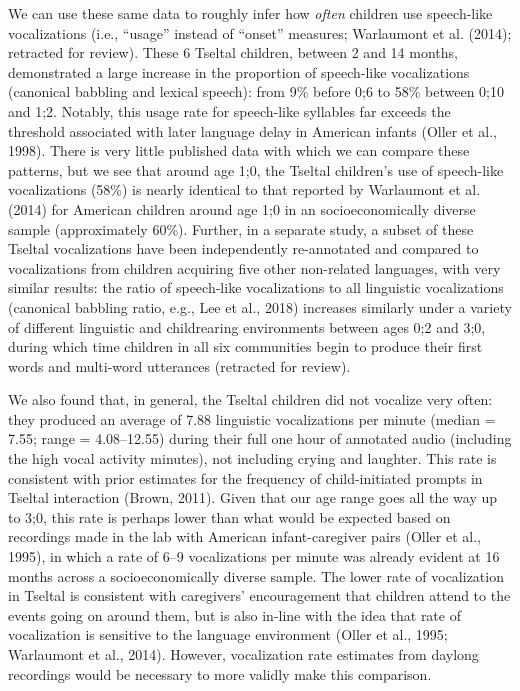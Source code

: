 \documentclass[floatsintext,man]{apa6}
\theoremstyle{definition}
\theoremstyle{definition}
\theoremstyle{definition}
\theoremstyle{remark}
\begin{document}
We can use these same data to roughly infer how \emph{often} children
use speech-like vocalizations (i.e., \enquote{usage} instead of
\enquote{onset} measures; Warlaumont et al. (2014); retracted for
review). These 6 Tseltal children, between 2 and 14 months, demonstrated
a large increase in the proportion of speech-like vocalizations
(canonical babbling and lexical speech): from 9\% before 0;6 to 58\%
between 0;10 and 1;2. Notably, this usage rate for speech-like syllables
far exceeds the threshold associated with later language delay in
American infants (Oller et al., 1998). There is very little published
data with which we can compare these patterns, but we see that around
age 1;0, the Tseltal children's use of speech-like vocalizations (58\%)
is nearly identical to that reported by Warlaumont et al. (2014) for
American children around age 1;0 in an socioeconomically diverse sample
(approximately 60\%). Further, in a separate study, a subset of these
Tseltal vocalizations have been independently re-annotated and compared
to vocalizations from children acquiring five other non-related
languages, with very similar results: the ratio of speech-like
vocalizations to all linguistic vocalizations (canonical babbling ratio,
e.g., Lee et al., 2018) increases similarly under a variety of different
linguistic and childrearing environments between ages 0;2 and 3;0,
during which time children in all six communities begin to produce their
first words and multi-word utterances (retracted for review).

We also found that, in general, the Tseltal children did not vocalize
very often: they produced an average of 7.88 linguistic vocalizations
per minute (median = 7.55; range = 4.08--12.55) during their full one
hour of annotated audio (including the high vocal activity minutes), not
including crying and laughter. This rate is consistent with prior
estimates for the frequency of child-initiated prompts in Tseltal
interaction (Brown, 2011). Given that our age range goes all the way up
to 3;0, this rate is perhaps lower than what would be expected based on
recordings made in the lab with American infant-caregiver pairs (Oller
et al., 1995), in which a rate of 6--9 vocalizations per minute was
already evident at 16 months across a socioeconomically diverse sample.
The lower rate of vocalization in Tseltal is consistent with caregivers'
encouragement that children attend to the events going on around them,
but is also in-line with the idea that rate of vocalization is sensitive
to the language environment (Oller et al., 1995; Warlaumont et al.,
2014). However, vocalization rate estimates from daylong recordings
would be necessary to more validly make this comparison.
\end{document}
